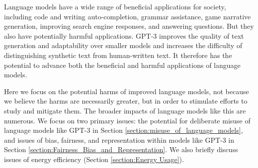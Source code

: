 Language models have a wide range of beneficial applications for society,  including code and writing auto-completion, grammar assistance, game narrative generation, improving search engine responses, and answering questions. But they also have potentially harmful applications. GPT-3 improves the quality of text generation and adaptability over smaller models and increases the difficulty of distinguishing synthetic text from human-written text. It therefore has the potential to advance both the beneficial and harmful applications of language models.

Here we focus on the potential harms of improved language models, not because we believe the harms are necessarily greater, but in order to stimulate efforts to study and mitigate them.  The broader impacts of language models like this are numerous. We focus on two primary issues: the potential for deliberate misuse of language models like GPT-3 in Section \ref{section:misuse_of_language_models}, and issues of bias, fairness, and representation within models like GPT-3 in Section \ref{section:Fairness_Bias_and_Representation}.  We also briefly discuss issues of energy efficiency (Section \ref{section:Energy Usage}).
 
